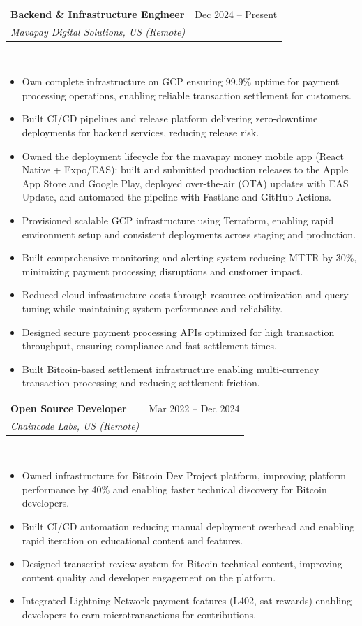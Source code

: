 \documentclass[a4paper,11pt]{article}
\makeatletter
\newenvironment{joblong}[3]
    {
    \needspace{6\baselineskip}
    \parskip=0pt
    \noindent
    \begin{tabular*}{\textwidth}[t]{@{}l@{\extracolsep{\fill}}r@{}}
    \textbf{#1} & #2 \\
    \textit{#3} &
    \end{tabular*}\\[2pt]
    \nopagebreak
    \begin{itemize}[nosep,after=\strut, leftmargin=1em, itemsep=2pt,label=--]
    }
    {
    \end{itemize}
    }
\makeatother
\begin{document}
\begin{joblong}{Backend \& Infrastructure Engineer}{Dec 2024 -- Present}{Mavapay Digital Solutions, US (Remote)}
\item Own complete infrastructure on GCP ensuring 99.9\% uptime for payment processing operations, enabling reliable transaction settlement for customers.
\item Built CI/CD pipelines and release platform delivering zero-downtime deployments for backend services, reducing release risk.
\item Owned the deployment lifecycle for the mavapay money mobile app (React Native + Expo/EAS): built and submitted production releases to the Apple App Store and Google Play, deployed over-the-air (OTA) updates with EAS Update, and automated the pipeline with Fastlane and GitHub Actions.
\item Provisioned scalable GCP infrastructure using Terraform, enabling rapid environment setup and consistent deployments across staging and production.
\item Built comprehensive monitoring and alerting system reducing MTTR by 30\%, minimizing payment processing disruptions and customer impact.
\item Reduced cloud infrastructure costs through resource optimization and query tuning while maintaining system performance and reliability.
\item Designed secure payment processing APIs optimized for high transaction throughput, ensuring compliance and fast settlement times.
\item Built Bitcoin-based settlement infrastructure enabling multi-currency transaction processing and reducing settlement friction.
\end{joblong}

\begin{joblong}{Open Source Developer}{Mar 2022 -- Dec 2024}{Chaincode Labs, US (Remote)}
\item Owned infrastructure for Bitcoin Dev Project platform, improving platform performance by 40\% and enabling faster technical discovery for Bitcoin developers.
\item Built CI/CD automation reducing manual deployment overhead and enabling rapid iteration on educational content and features.
\item Designed transcript review system for Bitcoin technical content, improving content quality and developer engagement on the platform.
\item Integrated Lightning Network payment features (L402, sat rewards) enabling developers to earn microtransactions for contributions.
\end{joblong}
\end{document}
